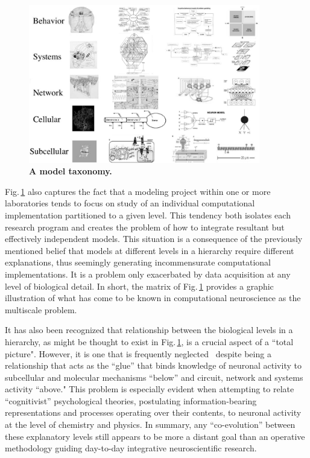 \documentclass[10pt,letterpaper]{article}
\begin{document}
\begin{figure}[h!t]
  \begin{center}
    \includegraphics[width=0.9\textwidth]{figures/fig1-bw.png} %
  \end{center}
  \caption{ \small{\bf A model taxonomy.} }
  \label{fig1}
\end{figure}

Fig.\,\ref{fig1} also captures the fact that a modeling project within one or more laboratories tends to focus on study of an individual computational implementation partitioned to a given level. This tendency both isolates each research program and creates the problem of how to integrate resultant but effectively independent models. This situation is a consequence of the previously mentioned belief that models at different levels in a hierarchy require different explanations, thus seemingly generating incommensurate computational implementations. It is a problem only exacerbated by data acquisition at any level of biological detail. In short, the matrix of Fig.\,\ref{fig1} provides a graphic illustration of what has come to be known in computational neuroscience as the multiscale problem.

It has also been recognized that relationship between the biological levels in a hierarchy, as might be thought to exist in Fig.\,\ref{fig1}, is a crucial aspect of a ``total picture". However, it is one that is frequently neglected~\cite{bickle19} despite being a relationship that acts as the “glue” that binds knowledge of neuronal activity to subcellular and molecular mechanisms “below” and circuit, network and systems activity “above." This problem is especially evident when attempting to relate “cognitivist” psychological theories, postulating information-bearing representations and processes operating over their contents, to neuronal activity at the level of chemistry and physics. In summary, any “co-evolution” between these explanatory levels still appears to be more a distant goal than an operative methodology guiding day-to-day integrative neuroscientific research.
\end{document}
